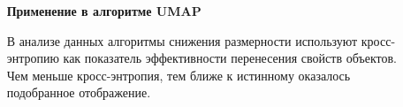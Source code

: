 \documentclass[final]{beamer}
\newlength{\sepwid}
\newlength{\onecolwid}
\newlength{\twocolwid}
\begin{document}
\begin{frame}[t]
\begin{columns}[t]
\begin{column}{\twocolwid}

\begin{columns}[t,totalwidth=\twocolwid] %

\begin{column}{\onecolwid} %



\end{column} %

\begin{column}{\onecolwid} %





\end{column} %

\end{columns} %

\end{column} %

\begin{column}{\sepwid}\end{column} %

\begin{column}{\onecolwid} %


\textbf{Применение в алгоритме UMAP}

В анализе данных алгоритмы снижения размерности используют кросс-энтропию как показатель эффективности перенесения свойств объектов. Чем меньше кросс-энтропия, тем ближе к истинному оказалось подобранное отображение.


\end{column}
\end{columns}
\end{frame}
\end{document}
